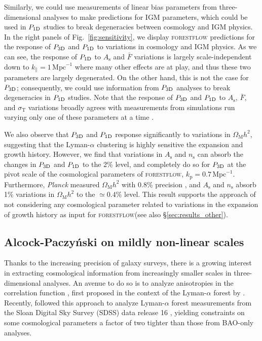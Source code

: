 \documentclass{aa}
\newcommand{\lya}{Lyman-$\alpha$\xspace}
\newcommand{\lyaf}{Lyman-$\alpha$ forest\xspace}
\newcommand{\poned}{\ensuremath{P_{\rm 1D}}\xspace}
\newcommand{\pthreed}{\ensuremath{P_{\rm 3D}}\xspace}
\newcommand{\forestflow}{\textsc{forestflow}\xspace}
\newcommand{\iMpc}{\ensuremath{\,\mathrm{Mpc}^{-1}}}
\begin{document}
Similarly, we could use measurements of linear bias parameters from three-dimensional analyses \citep{dumasdesbourboux2020CompletedSDSSIVExtended, desicollaboration2024DESI2024IV} to make predictions for IGM parameters, which could be used in \poned studies to break degeneracies between cosmology and IGM physics. In the right panels of Fig.~\ref{fig:sensitivity}, we display \forestflow predictions for the response of \pthreed and \poned to variations in cosmology and IGM physics. As we can see, the response of \poned to $A_\mathrm{s}$ and $\bar{F}$ variations is largely scale-independent down to $k_\parallel=1\iMpc$ where many other effects are at play, and thus these two parameters are largely degenerated. On the other hand, this is not the case for \pthreed; consequently, we could use information from \pthreed analyses to break degeneracies in \poned studies. Note that the response of \pthreed and \poned to $A_\mathrm{s}$, $\bar{F}$, and $\sigma_\mathrm{T}$ variations broadly agrees with measurements from simulations run varying only one of these parameters at a time \citep{mcdonald2003MeasurementCosmologicalGeometry, mcdonald2005LinearTheoryPower}.

We also observe that \pthreed and \poned response significantly to variations in $\Omega_\mathrm{M}h^2$, suggesting that the \lya clustering is highly sensitive the expansion and growth history. However, we find that variations in $A_\mathrm{s}$ and $n_\mathrm{s}$ can absorb the changes in \pthreed and \poned to the 2\% level, and completely do so for \pthreed at the pivot scale of the cosmological parameters of \forestflow, $k_\mathrm{p}=0.7\iMpc$. Furthermore, {\it Planck} measured $\Omega_\mathrm{M}h^2$ with 0.8\% precision \citet{planckcollaboration2020Planck2018Resultsa}, and $A_\mathrm{s}$ and $n_\mathrm{s}$ absorb 1\% variations in $\Omega_\mathrm{M}h^2$ to the $\simeq0.4\%$ level. This result supports the approach of not considering any cosmological parameter related to variations in the expansion of growth history as input for \forestflow (see also \S\ref{sec:results_other}).



\subsection{Alcock-Paczy\'nski on mildly non-linear scales}

Thanks to the increasing precision of galaxy surveys, there is a growing interest in extracting cosmological information from increasingly smaller scales in three-dimensional analyses. An avenue to do so is to analyze anisotropies in the correlation function \citet[AP test;][]{alcock1979EvolutionFreeTesta}, first proposed in the context of the \lyaf by \citet{1999ApJ...518...24M, hui1999GeometricalTestCosmological}. Recently, \cite{cuceu2023ConstraintsCosmicExpansion} followed this approach to analyze \lyaf measurements from the Sloan Digital Sky Survey (SDSS) data release 16 \citep[DR16;][]{Ahumada2020_DR16}, yielding constraints on some cosmological parameters a factor of two tighter than those from BAO-only analyses. 
\end{document}
